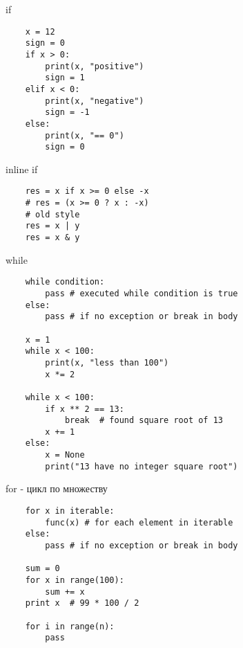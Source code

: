 \documentclass{article}
\begin{document}
\begin{center} if \end{center}
\vspace{15pt}
\begin{lstlisting}
	x = 12
	sign = 0
	if x > 0:
	    print(x, "positive")
	    sign = 1
	elif x < 0:
	    print(x, "negative")
	    sign = -1
	else:
	    print(x, "== 0")
	    sign = 0
\end{lstlisting}
\newpage

\begin{center} inline if \end{center}
\vspace{15pt}
\begin{lstlisting}
	res = x if x >= 0 else -x
	# res = (x >= 0 ? x : -x)
    # old style
    res = x | y
    res = x & y
\end{lstlisting}
\newpage

\begin{center} while \end{center}
\vspace{15pt}
\begin{lstlisting}
	while condition:
		pass # executed while condition is true
	else:
		pass # if no exception or break in body

	x = 1
	while x < 100:
		print(x, "less than 100")
		x *= 2

	while x < 100:
		if x ** 2 == 13:
			break  # found square root of 13
		x += 1
	else:
		x = None
		print("13 have no integer square root")
\end{lstlisting}
\newpage

\begin{center} for - цикл по множеству \end{center}
\vspace{15pt}
\begin{lstlisting}
	for x in iterable:
		func(x) # for each element in iterable
	else:
		pass # if no exception or break in body

	sum = 0
	for x in range(100):
		sum += x
	print x  # 99 * 100 / 2

	for i in range(n):
	    pass

\end{lstlisting}
\newpage
\end{document}
